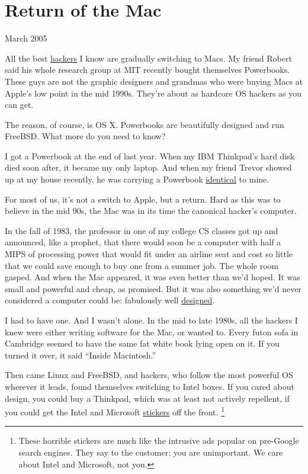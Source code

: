 \chapter{Return of the Mac}

March 2005

All the best \href{gba.html}{hackers} I know are gradually switching to
Macs. My friend Robert said his whole research group at MIT recently
bought themselves Powerbooks. These guys are not the graphic designers
and grandmas who were buying Macs at Apple's low point in the mid 1990s.
They're about as hardcore OS hackers as you can get.

The reason, of course, is OS X. Powerbooks are beautifully designed and
run FreeBSD. What more do you need to know?

I got a Powerbook at the end of last year. When my IBM Thinkpad's hard
disk died soon after, it became my only laptop. And when my friend
Trevor showed up at my house recently, he was carrying a Powerbook
\href{tlbmac.html}{identical} to mine.

For most of us, it's not a switch to Apple, but a return. Hard as this
was to believe in the mid 90s, the Mac was in its time the canonical
hacker's computer.

In the fall of 1983, the professor in one of my college CS classes got
up and announced, like a prophet, that there would soon be a computer
with half a MIPS of processing power that would fit under an airline
seat and cost so little that we could save enough to buy one from a
summer job. The whole room gasped. And when the Mac appeared, it was
even better than we'd hoped. It was small and powerful and cheap, as
promised. But it was also something we'd never considered a computer
could be: fabulously well \href{taste.html}{designed}.

I had to have one. And I wasn't alone. In the mid to late 1980s, all the
hackers I knew were either writing software for the Mac, or wanted to.
Every futon sofa in Cambridge seemed to have the same fat white book
lying open on it. If you turned it over, it said ``Inside Macintosh.''

Then came Linux and FreeBSD, and hackers, who follow the most powerful
OS wherever it leads, found themselves switching to Intel boxes. If you
cared about design, you could buy a Thinkpad, which was at least not
actively repellent, if you could get the Intel and Microsoft
\href{designedforwindows.html}{stickers} off the front. \footnote{These horrible stickers are much like the intrusive ads popular
on pre-Google search engines. They say to the customer: you are
unimportant. We care about Intel and Microsoft, not you.}


